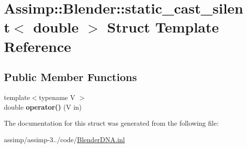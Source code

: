 \hypertarget{struct_assimp_1_1_blender_1_1static__cast__silent_3_01double_01_4}{\section{Assimp\+:\+:Blender\+:\+:static\+\_\+cast\+\_\+silent$<$ double $>$ Struct Template Reference}
\label{struct_assimp_1_1_blender_1_1static__cast__silent_3_01double_01_4}
}
\subsection*{Public Member Functions}
\begin{DoxyCompactItemize}
\item 
\hypertarget{struct_assimp_1_1_blender_1_1static__cast__silent_3_01double_01_4_aaf34fd18dce4748483a817b503b42812}{{\footnotesize template$<$typename V $>$ }\\double {\bfseries operator()} (V in)}\label{struct_assimp_1_1_blender_1_1static__cast__silent_3_01double_01_4_aaf34fd18dce4748483a817b503b42812}

\end{DoxyCompactItemize}


The documentation for this struct was generated from the following file\+:\begin{DoxyCompactItemize}
\item 
assimp/assimp-\/3../code/\hyperlink{_blender_d_n_a_8inl}{Blender\+D\+N\+A.\+inl}\end{DoxyCompactItemize}
